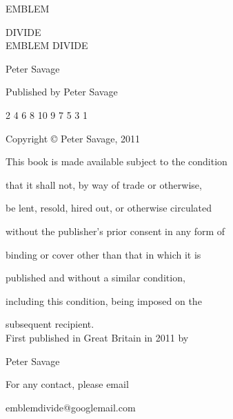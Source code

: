 ﻿\begin{center}

EMBLEM

DIVIDE
\\[1in]
EMBLEM DIVIDE

Peter Savage

Published by Peter Savage

2 4 6 8 10 9 7 5 3 1

Copyright © Peter Savage, 2011

This book is made available subject to the condition 

that it shall not, by way of trade or otherwise, 

be lent, resold, hired out, or otherwise circulated 

without the publisher's prior consent in any form of 

binding or cover other than that in which it is 

published and without a similar condition,

including this condition, being imposed on the 

subsequent recipient.
\\[1in]
First published in Great Britain in 2011 by

Peter Savage

For any contact, please email

emblemdivide@googlemail.com
\end{center}
